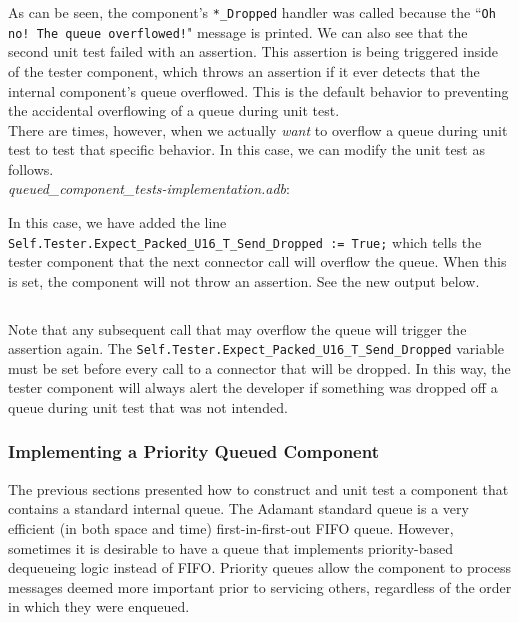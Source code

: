As can be seen, the component's \texttt{*\_Dropped} handler was called because the ``\texttt{Oh no! The queue overflowed!}" message is printed. We can also see that the second unit test failed with an assertion. This assertion is being triggered inside of the tester component, which throws an assertion if it ever detects that the internal component's queue overflowed. This is the default behavior to preventing the accidental overflowing of a queue during unit test. \\

There are times, however, when we actually \textit{want} to overflow a queue during unit test to test that specific behavior. In this case, we can modify the unit test as follows. \\

\textit{queued\_component\_tests-implementation.adb}:

In this case, we have added the line \texttt{Self.Tester.Expect\_Packed\_U16\_T\_Send\_Dropped := True;} which tells the tester component that the next connector call will overflow the queue. When this is set, the component will not throw an assertion. See the new output below.

\vspace{5mm} %
\inputminted{text}{../example_architecture/queued_component/test2/output.txt}
\vspace{5mm} %

Note that any subsequent call that may overflow the queue will trigger the assertion again. The \texttt{Self.Tester.Expect\_Packed\_U16\_T\_Send\_Dropped} variable must be set before every call to a connector that will be dropped. In this way, the tester component will always alert the developer if something was dropped off a queue during unit test that was not intended. 

\subsubsection{Implementing a Priority Queued Component} \label{Implementing a Priority Queued Component}

The previous sections presented how to construct and unit test a component that contains a standard internal queue. The Adamant standard queue is a very efficient (in both space and time) first-in-first-out FIFO queue. However, sometimes it is desirable to have a queue that implements priority-based dequeueing logic instead of FIFO. Priority queues allow the component to process messages deemed more important prior to servicing others, regardless of the order in which they were enqueued. \\

